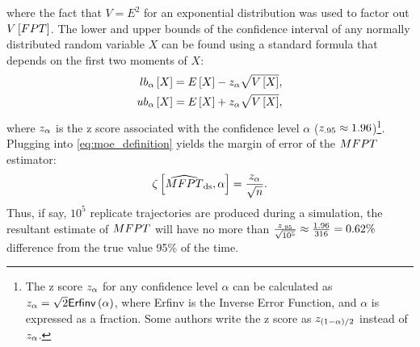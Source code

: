 where the fact that $V = E^2$ for an exponential distribution was used to factor out $V \left[ FPT \right]$. The lower and upper bounds of the confidence interval of any normally distributed random variable $X$ can be found using a standard formula\supercite{Ross:2010wr} that depends on the first two moments of $X$:
    \begin{align}\label{eq:gaussian_ci_bound}
        \begin{split}
            lb_{\alpha} \left[ X \right] &= E \left[ X \right] - z_{\alpha} \sqrt{V \left[ X \right]},   \\
            ub_{\alpha} \left[ X \right] &= E \left[ X \right] + z_{\alpha} \sqrt{V \left[ X \right]},
        \end{split}
    \end{align}
where $z_{\alpha}$ is the z score associated with the confidence level $\alpha$ (\eg $z_{.95} \approx 1.96$)\footnote{The z score $z_{\alpha}$ for any confidence level $\alpha$ can be calculated as $z_{\alpha} = \sqrt{2} \mathsf{Erfinv}\left( \alpha \right)$, where Erfinv is the Inverse Error Function\supercite{Carlitz:1963vu}, and $\alpha$ is expressed as a fraction. Some authors write the z score as $z_{(1-\alpha)/2}$ instead of $z_{\alpha}$\supercite{Ross:2010wr}.}. Plugging  into \eqref{eq:moe_definition} yields the margin of error of the  $MFPT$ estimator:
    \begin{equation}\label{eq:moe_mfptestds}
        \zeta \left[ \widehat{MFPT}_{\text{ds}}, \alpha \right] = \frac{z_{\alpha}}{\sqrt{n}}.
    \end{equation}
Thus, if say, $10^5$ replicate trajectories are produced during a  simulation, the resultant estimate of $MFPT$ will have no more than $\frac{z_{.95}}{\sqrt{10^5}} \approx \frac{1.96}{316} = 0.62\%$ difference from the true value 95\% of the time.



